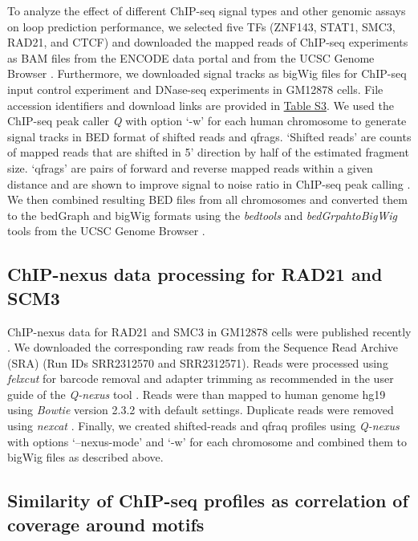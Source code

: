 \documentclass[a4paper,twoside=true,openright,parskip=full,chapterprefix=true,11pt,headings=normal,bibliography=totoc,listof=totoc,titlepage=on,captions=tableabove,draft=false]{scrreprt}
\theoremstyle{definition}
\theoremstyle{definition}
\theoremstyle{definition}
\theoremstyle{remark}
\begin{document}
To analyze the effect of different ChIP-seq signal types and other
genomic assays on loop prediction performance, we selected five TFs
(ZNF143, STAT1, SMC3, RAD21, and CTCF) and downloaded the mapped reads
of ChIP-seq experiments as BAM files from the ENCODE data portal
\citep{Davis2017} and from the UCSC Genome Browser \citep{Hinrichs2006}.
Furthermore, we downloaded signal tracks as bigWig files for ChIP-seq
input control experiment and DNase-seq experiments in GM12878 cells.
File accession identifiers and download links are provided in
\protect\hyperlink{LoopPredSupTab}{Table S3}. We used the ChIP-seq peak
caller \emph{Q} \citep{Hansen2015} with option `-w' for each human
chromosome to generate signal tracks in BED format of shifted reads and
qfrags. `Shifted reads' are counts of mapped reads that are shifted in
5' direction by half of the estimated fragment size. `qfrags' are pairs
of forward and reverse mapped reads within a given distance
\citep{Hansen2015} and are shown to improve signal to noise ratio in
ChIP-seq peak calling \citep{Hansen2015}. We then combined resulting BED
files from all chromosomes and converted them to the bedGraph and bigWig
formats using the \emph{bedtools} \citep{Quinlan2010} and
\emph{bedGrpahtoBigWig} tools from the UCSC Genome Browser
\citep{Kent2010}.

\hypertarget{chip-nexus-data-processing-for-rad21-and-scm3}{%
\subsection{ChIP-nexus data processing for RAD21 and
SCM3}\label{chip-nexus-data-processing-for-rad21-and-scm3}}

ChIP-nexus data for RAD21 and SMC3 in GM12878 cells were published
recently \citep{Tang2015}. We downloaded the corresponding raw reads
from the Sequence Read Archive (SRA) (Run IDs SRR2312570 and
SRR2312571). Reads were processed using \emph{felxcut} for barcode
removal and adapter trimming as recommended in the user guide of the
\emph{Q-nexus} tool \citep{Hansen2016}. Reads were than mapped to human
genome hg19 using \emph{Bowtie} version 2.3.2 with default settings.
Duplicate reads were removed using \emph{nexcat} \citep{Hansen2016}.
Finally, we created shifted-reads and qfraq profiles using
\emph{Q-nexus} \citep{Hansen2016} with options `--nexus-mode' and `-w'
for each chromosome and combined them to bigWig files as described
above.

\hypertarget{similarity-of-chip-seq-profiles-as-correlation-of-coverage-around-motifs}{%
\subsection{Similarity of ChIP-seq profiles as correlation of coverage
around
motifs}\label{similarity-of-chip-seq-profiles-as-correlation-of-coverage-around-motifs}}
\end{document}
